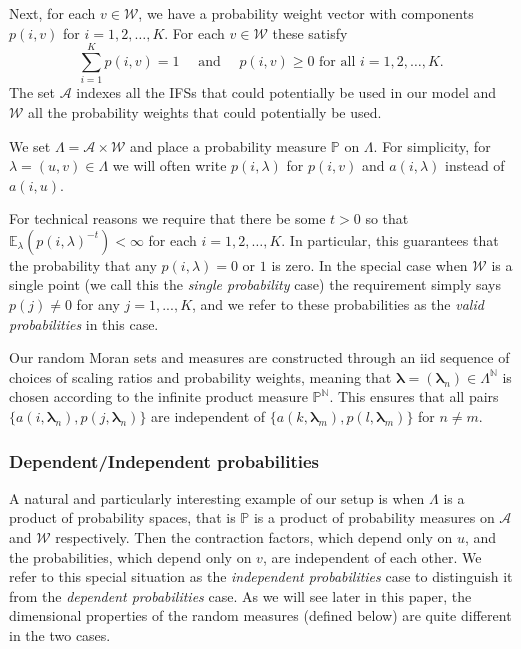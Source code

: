 \documentclass{amsart}
\theoremstyle{plain}
\numberwithin{equation}{section}
\newcommand{\N}{{\mathbb N}}
\renewcommand{\P}{{\mathbb P}}
\newcommand{\cA}{{\mathcal A}}
\newcommand{\cW}{{\mathcal W}}
\newcommand{\blambda}{{\boldsymbol{\lambda}}}
\newcommand{\ee}{{\mathbb E}}
\begin{document}
Next, for each $v \in \cW$, we have a probability weight vector with components $p(i,v)$ for $i=1,2,\ldots, K$. 
For each $v \in \cW$ these satisfy
\begin{equation} \label{eq:probability_constraints}
  \sum_{i=1}^K p(i,v) = 1  \quad \text{ and } \quad p(i,v) \ge 0 \text{ for all } i=1,2,\ldots, K.
\end{equation}
The set $\cA$ indexes all the IFSs that could potentially be used in our model and $\cW$ all the probability weights that could potentially be used.

\medskip

We set $\Lambda = \cA \times \cW$ and place a probability measure $\P$ on $\Lambda$.
For simplicity, for $\lambda = (u,v) \in \Lambda$ we will often write $p(i,\lambda)$ for $p(i,v)$ and $a(i,\lambda)$ instead of $a(i,u)$.

\medskip

For technical reasons we require that there be some $t > 0$ so that $\ee_\lambda( p(i,\lambda)^{-t}) < \infty$ for each $i=1,2,\ldots, K$.
In particular, this guarantees that the probability that any $p(i,\lambda) = 0$ or $1$ is zero.
In the special case when $\cW$ is a single point  (we call this the \emph{single probability} case) the
requirement simply says $p(j) \neq 0$ for any $j=1,...,K$,  and we refer to these probabilities as the \emph{valid probabilities} in this case.

Our random Moran sets and measures are constructed through an iid sequence 
of choices of scaling ratios and probability weights,
meaning that $\blambda= (\blambda_{n})\in \Lambda^\N$ is chosen according to the infinite product measure $\P^{\mathbb{N}}$. 
This ensures that all pairs $\{a(i,\blambda_{n}),p(j,\blambda_{n})\}$ are independent of $\{a(k,{\blambda}_{m}),p(l,{\blambda}_{m})\}$ for $n\neq m$.




\subsubsection{Dependent/Independent probabilities}

A natural and particularly interesting example of our setup is when $\Lambda$ 
is a product of probability spaces, that is $\P$ is a product of probability measures on $\cA$ and $\cW$ respectively.
Then the contraction factors, which depend only on $u$, and the probabilities, which depend only on 
$v$, are independent of each other. 
We refer to this special situation as the \emph{independent probabilities} case to distinguish it from the 
\emph{dependent probabilities} case. 
As we will see later in this paper, the dimensional properties of the random measures (defined below) are quite
different in the two cases.
\end{document}
